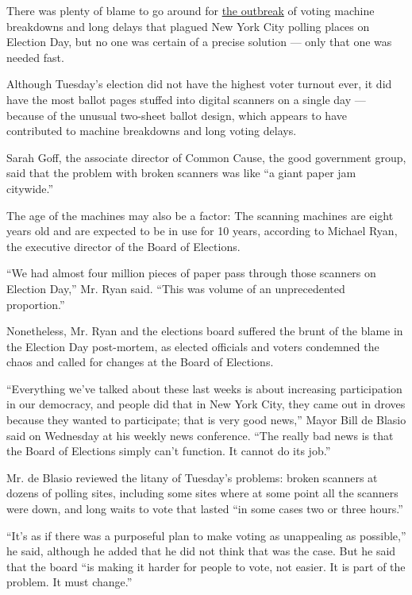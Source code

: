 There was plenty of blame to go around for
\href{https://www.nytimes.com/2018/11/06/nyregion/nyc-voting-machines.html}{the
outbreak} of voting machine breakdowns and long delays that plagued New
York City polling places on Election Day, but no one was certain of a
precise solution --- only that one was needed fast.

Although Tuesday's election did not have the highest voter turnout ever,
it did have the most ballot pages stuffed into digital scanners on a
single day --- because of the unusual two-sheet ballot design, which
appears to have contributed to machine breakdowns and long voting
delays.

Sarah Goff, the associate director of Common Cause, the good government
group, said that the problem with broken scanners was like ``a giant
paper jam citywide.''

The age of the machines may also be a factor: The scanning machines are
eight years old and are expected to be in use for 10 years, according to
Michael Ryan, the executive director of the Board of Elections.

``We had almost four million pieces of paper pass through those scanners
on Election Day,'' Mr. Ryan said. ``This was volume of an unprecedented
proportion.''

Nonetheless, Mr. Ryan and the elections board suffered the brunt of the
blame in the Election Day post-mortem, as elected officials and voters
condemned the chaos and called for changes at the Board of Elections.

``Everything we've talked about these last weeks is about increasing
participation in our democracy, and people did that in New York City,
they came out in droves because they wanted to participate; that is very
good news,'' Mayor Bill de Blasio said on Wednesday at his weekly news
conference. ``The really bad news is that the Board of Elections simply
can't function. It cannot do its job.''

Mr. de Blasio reviewed the litany of Tuesday's problems: broken scanners
at dozens of polling sites, including some sites where at some point all
the scanners were down, and long waits to vote that lasted ``in some
cases two or three hours.''

``It's as if there was a purposeful plan to make voting as unappealing
as possible,'' he said, although he added that he did not think that was
the case. But he said that the board ``is making it harder for people to
vote, not easier. It is part of the problem. It must change.''


